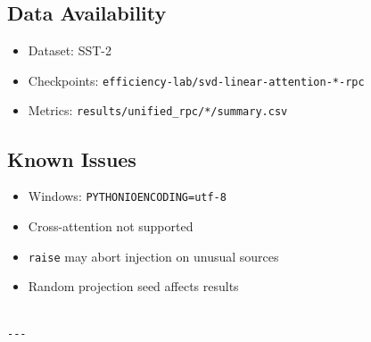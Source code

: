 \subsection{Data Availability}

\begin{itemize}
\item Dataset: SST-2
\item Checkpoints: \texttt{efficiency-lab/svd-linear-attention-*-rpc}
\item Metrics: \texttt{results/unified\_rpc/*/summary.csv}

\end{itemize}
\subsection{Known Issues}

\begin{itemize}
\item Windows: \texttt{PYTHONIOENCODING=utf-8}
\item Cross-attention not supported
\item \texttt{raise} may abort injection on unusual sources
\item Random projection seed affects results
\end{itemize}
\begin{lstlisting}

---
\end{lstlisting}